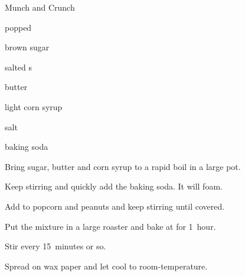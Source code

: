 \begin{recipe}{Munch and Crunch}{}{}

\begin{ingredients}
\item {} popped 
\item {} brown sugar
\item \C{1 \half} salted s
\item {} butter
\item \C{\half} light corn syrup
\item {} salt
\item \tp{\half} baking soda
\end{ingredients}

\begin{directions}
\item Bring sugar, butter and corn syrup to a rapid boil in a large pot.
\item Keep stirring and quickly add the baking soda. It will foam.
\item Add to popcorn and peanuts and keep stirring until covered.
\item Put the mixture in a large roaster and bake at  for 1~hour.
\item Stir every 15~minutes or so.
\item Spread on wax paper and let cool to room-temperature.
\end{directions}
\end{recipe}
